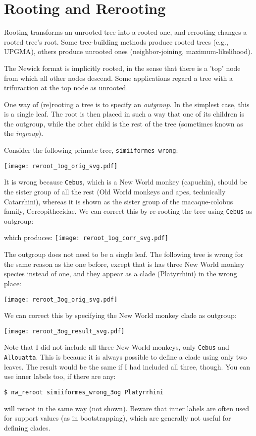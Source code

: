 
\section{Rooting and Rerooting}
\label{sct_reroot}

Rooting transforms an unrooted tree into a rooted one, and rerooting changes a rooted tree's root. Some tree-building methods produce rooted trees (e.g., \textsc{UPGMA}), others produce unrooted ones (neighbor-joining, maximum-likelihood). 

The Newick format is implicitly rooted, in the sense that there is a 'top' node from which all other nodes descend. Some applications regard a tree with a trifuraction at the top node as unrooted. 

One way of (re)rooting a tree is to specify an \textit{outgroup}. In the simplest case, this is a single leaf. The root is then placed in such a way that one of its children is the outgroup, while the other child is the rest of the tree (sometimes known as the \textit{ingroup}). 

Consider the following primate tree, \texttt{simiiformes\_wrong}:

\texttt{[image: reroot\_1og\_orig\_svg.pdf]}

\noindent{}It is wrong because \texttt{Cebus}, which is a New World monkey (capuchin), should be the sister group of all the rest (Old World monkeys and apes, technically Catarrhini), whereas it is shown as the sister group of the macaque-colobus family, Cercopithecidae. We can correct this by re-rooting the tree using \texttt{Cebus} as outgroup:

which produces:
\texttt{[image: reroot\_1og\_corr\_svg.pdf]}

The outgroup does not need to be a single leaf. The following tree is wrong for the same reason as the one before, except that is has three New World monkey species instead of one, and they appear as a clade (Platyrrhini) in the wrong place:

\texttt{[image: reroot\_3og\_orig\_svg.pdf]}

\noindent{}We can correct this by specifying the New World monkey clade as outgroup:



\texttt{[image: reroot\_3og\_result\_svg.pdf]}

\noindent{}Note that I did not include all three New World monkeys, only \texttt{Cebus} and \texttt{Allouatta}. This is because it is always possible to define a clade using only two leaves. The result would be the same if I had included all three, though. You can use inner labels too, if there are any:
\begin{verbatim}
$ nw_reroot simiiformes_wrong_3og Platyrrhini
\end{verbatim}
will reroot in the same way (not shown). Beware that inner labels are often used for support values (as in bootstrapping), which are generally not useful for defining clades.

